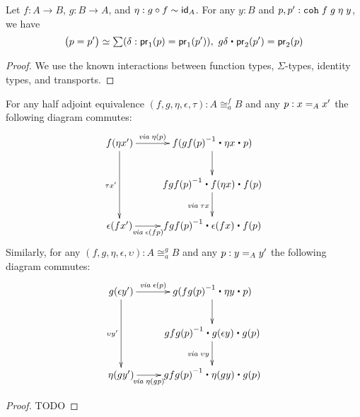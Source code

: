 \begin{lem}\label{lem:coheq}
Let $f : A \to B$, $g : B \to A$, and $\eta : g \circ f \sim \idfunc[A]$. For any $y : B$ and $p, p' :\coh{f}{g}{\eta} \; y$, we have
\[ \big(p = p'\big) \simeq \sm{\delta : \proj{1}(p) = \proj{1}(p')} g \delta \ct \proj{2}(p') = \proj{2}(p) \]
\end{lem}
\begin{proof}
We use the known interactions between function types, $\Sigma$-types, identity types, and transports.
\end{proof}

\begin{cor}\label{lem:higher-hom}
For any half adjoint equivalence $(f,g,\eta,\epsilon,\tau) : A \cong_a^f B$ and any $p : \id[A]{x}{x'}$ the following diagram commutes:
\begin{align*}
\xymatrix{
f(\eta x') \ar[dd]_{\tau x'} \ar[r]^{\mathit{via \;} \eta(p) \;\;\;\;\; \; \;\;\;\;\;\;} & f(\opp{gf(p)} \ct \eta x \ct p) \ar[d] \\
& \opp{fgf(p)} \ct f(\eta x) \ct f(p) \ar[d]_{\mathit{via \;} \tau x} \\
\epsilon(f x') \ar[r]_{\mathit{via \;} \epsilon(fp)\;\;\;\;\; \; \;\;\;\;\;\;\;\;\;\;}  & \opp{fgf(p)} \ct \epsilon (fx) \ct f(p)}
\end{align*}
Similarly, for any $(f,g,\eta,\epsilon,\upsilon) : A \cong_a^g B$ and any $p : \id[A]{y}{y'}$ the following diagram commutes:
\begin{align*}
\xymatrix{
g(\epsilon y') \ar[dd]_{\upsilon y'} \ar[r]^{\mathit{via \;} \epsilon(p) \;\;\;\;\; \; \;\;\;\;\;\;} & g(\opp{fg(p)} \ct \eta y \ct p) \ar[d] \\
& \opp{gfg(p)} \ct g(\epsilon y) \ct g(p) \ar[d]_{\mathit{via \;} \upsilon y} \\
\eta(g y') \ar[r]_{\mathit{via \;} \eta(gp)\;\;\;\;\; \; \;\;\;\;\;\;\;\;\;\;}  & \opp{gfg(p)} \ct \eta (gy) \ct g(p)}
\end{align*}
\end{cor}
\begin{proof}
TODO
\end{proof}

